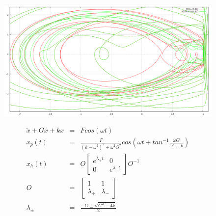 \documentclass[xcolor=x11names,compress]{beamer}
\renewcommand{\(}{\begin{columns}}
\renewcommand{\)}{\end{columns}}
\newcommand{\<}[1]{\begin{column}{#1}}
\renewcommand{\>}{\end{column}}
\begin{document}
\begin{frame}
\begin{figure}
\begin{center}
\includegraphics[width=0.9\columnwidth]{soft-impact-zoomed}
\end{center}
\end{figure}
\end{frame}


\begin{frame}[label=SHM-driven]
\begin{eqnarray*}
\ddot{x}+G\dot{x}+kx&=&Fcos(\omega t)\\
x_p(t)&=&\frac{F}{(k-\omega^2)^2+\omega^2G^2}cos(\omega t+tan^{-1}\frac{\omega G}{\omega^2-k})\\
x_h(t)&=&O\begin{bmatrix}e^{\lambda_+t} & 0\\0 & e^{\lambda_-t}\end{bmatrix}O^{-1}\\
O&=&\begin{bmatrix}1 & 1 \\ \lambda_+ & \lambda_-\end{bmatrix}\\
\lambda_\pm&=&\frac{-G\pm\sqrt{G^2-4k}}{2}
\end{eqnarray*}

\hyperlink{BackFromSHMFormula}{}
\end{frame}
\end{document}
